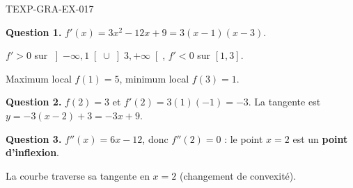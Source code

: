 \begin{corrige}{TEXP-GRA-EX-017}

\textbf{Question 1.} $f'(x) = 3x^2 - 12x + 9 = 3(x-1)(x-3)$.


$f' > 0$ sur $\left]-\infty,1\right[ \cup \left]3,+\infty\right[$, $f' < 0$ sur $[1,3]$.

Maximum local $f(1) = 5$, minimum local $f(3) = 1$.

\textbf{Question 2.} $f(2) = 3$ et $f'(2) = 3(1)(-1) = -3$. La tangente est $y = -3(x-2)+3 = -3x+9$.

\textbf{Question 3.} $f''(x) = 6x - 12$, donc $f''(2) = 0$ : le point $x=2$ est un \textbf{point d'inflexion}.

La courbe traverse sa tangente en $x = 2$ (changement de convexité).

\end{corrige}
